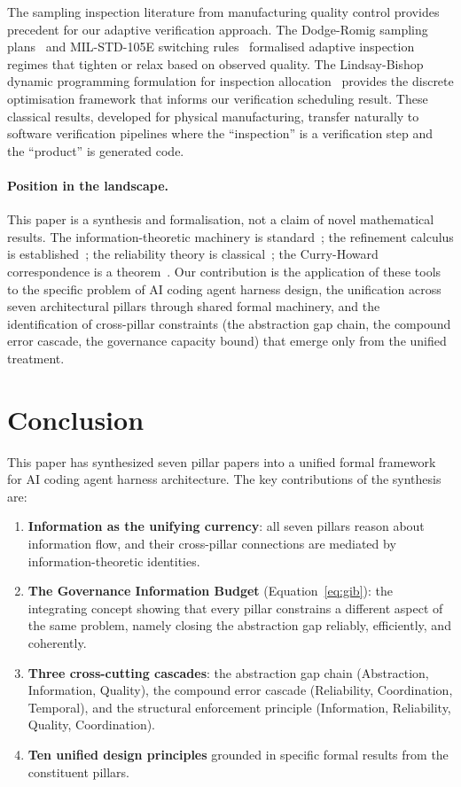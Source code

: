 \documentclass[11pt, a4paper, logo, copyright]{googledeepmind}
\begin{document}
The sampling inspection literature from manufacturing quality control provides precedent for our adaptive verification approach. The Dodge-Romig sampling plans~\citep{dodge1929method, dodge1959sampling} and MIL-STD-105E switching rules~\citep{milstd105e} formalised adaptive inspection regimes that tighten or relax based on observed quality. The Lindsay-Bishop dynamic programming formulation for inspection allocation~\citep{lindsay1964allocation} provides the discrete optimisation framework that informs our verification scheduling result. These classical results, developed for physical manufacturing, transfer naturally to software verification pipelines where the ``inspection'' is a verification step and the ``product'' is generated code.

\paragraph{Position in the landscape.}
This paper is a synthesis and formalisation, not a claim of novel mathematical results. The information-theoretic machinery is standard~\citep{li2019introduction}; the refinement calculus is established~\citep{back1980correctness, morgan1994programming}; the reliability theory is classical~\citep{barlow1965mathematical}; the Curry-Howard correspondence is a theorem~\citep{wadler2015propositions}. Our contribution is the application of these tools to the specific problem of AI coding agent harness design, the unification across seven architectural pillars through shared formal machinery, and the identification of cross-pillar constraints (the abstraction gap chain, the compound error cascade, the governance capacity bound) that emerge only from the unified treatment.
\section{Conclusion}
\label{sec:conclusion}

This paper has synthesized seven pillar papers into a unified formal framework for AI coding agent harness architecture. The key contributions of the synthesis are:

\begin{enumerate}
    \item \textbf{Information as the unifying currency}: all seven pillars reason about information flow, and their cross-pillar connections are mediated by information-theoretic identities.
    \item \textbf{The Governance Information Budget} (Equation~\ref{eq:gib}): the integrating concept showing that every pillar constrains a different aspect of the same problem, namely closing the abstraction gap reliably, efficiently, and coherently.
    \item \textbf{Three cross-cutting cascades}: the abstraction gap chain (Abstraction, Information, Quality), the compound error cascade (Reliability, Coordination, Temporal), and the structural enforcement principle (Information, Reliability, Quality, Coordination).
    \item \textbf{Ten unified design principles} grounded in specific formal results from the constituent pillars.
\end{enumerate}
\end{document}
